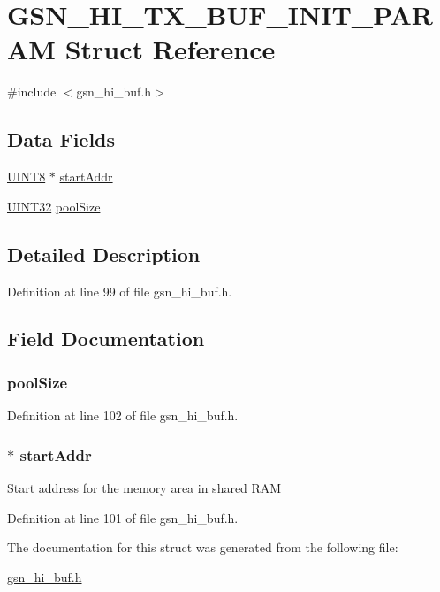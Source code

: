 \hypertarget{a00091}{
\section{GSN\_\-HI\_\-TX\_\-BUF\_\-INIT\_\-PARAM Struct Reference}
\label{a00091}
}


{\ttfamily \#include $<$gsn\_\-hi\_\-buf.h$>$}

\subsection*{Data Fields}
\begin{DoxyCompactItemize}
\item 
\hyperlink{a00660_gab27e9918b538ce9d8ca692479b375b6a}{UINT8} $\ast$ \hyperlink{a00091_a4470f0ec066927d0919c2a5e47a5fa88}{startAddr}
\item 
\hyperlink{a00660_gae1e6edbbc26d6fbc71a90190d0266018}{UINT32} \hyperlink{a00091_a28cbab59f2738abb8fb95b0d98e25d2b}{poolSize}
\end{DoxyCompactItemize}


\subsection{Detailed Description}


Definition at line 99 of file gsn\_\-hi\_\-buf.h.



\subsection{Field Documentation}
\hypertarget{a00091_a28cbab59f2738abb8fb95b0d98e25d2b}{
\subsubsection[{poolSize}]{ {\bf poolSize}}}
\label{a00091_a28cbab59f2738abb8fb95b0d98e25d2b}


Definition at line 102 of file gsn\_\-hi\_\-buf.h.

\hypertarget{a00091_a4470f0ec066927d0919c2a5e47a5fa88}{
\subsubsection[{startAddr}]{$\ast$ {\bf startAddr}}}
\label{a00091_a4470f0ec066927d0919c2a5e47a5fa88}
Start address for the memory area in shared RAM 

Definition at line 101 of file gsn\_\-hi\_\-buf.h.



The documentation for this struct was generated from the following file:\begin{DoxyCompactItemize}
\item 
\hyperlink{a00505}{gsn\_\-hi\_\-buf.h}\end{DoxyCompactItemize}
